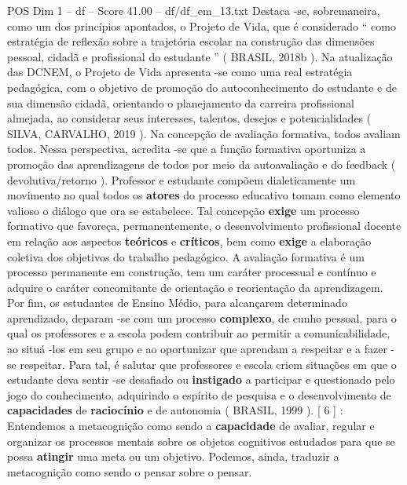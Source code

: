 \begin{textsample}{POS Dim 1 – df – Score 41.00 – df/df\_em\_13.txt}
Destaca -se, sobremaneira, como um dos princípios apontados, o Projeto de Vida, que é considerado “ como estratégia de reflexão sobre a trajetória escolar na construção das dimensões pessoal, cidadã e profissional do estudante ” ( BRASIL, 2018b ).
Na atualização das DCNEM, o Projeto de Vida apresenta -se como uma real estratégia pedagógica, com o objetivo de promoção do autoconhecimento do estudante e de sua dimensão cidadã, orientando o planejamento da carreira profissional almejada, ao considerar seus interesses, talentos, desejos e potencialidades ( SILVA, CARVALHO, 2019 ).
Na concepção de avaliação formativa, todos avaliam todos.
Nessa perspectiva, acredita -se que a função formativa oportuniza a promoção das aprendizagens de todos por meio da autoavaliação e do feedback ( devolutiva/retorno ).
Professor e estudante compõem dialeticamente um movimento no qual todos os \textbf{atores} do processo educativo tomam como elemento valioso o diálogo que ora se estabelece.
Tal concepção \textbf{exige} um processo formativo que favoreça, permanentemente, o desenvolvimento profissional docente em relação aos aspectos \textbf{teóricos} e \textbf{críticos}, bem como \textbf{exige} a elaboração coletiva dos objetivos do trabalho pedagógico.
A avaliação formativa é um processo permanente em construção, tem um caráter processual e contínuo e adquire o caráter concomitante de orientação e reorientação da aprendizagem.
Por fim, os estudantes de Ensino Médio, para alcançarem determinado aprendizado, deparam -se com um processo \textbf{complexo}, de cunho pessoal, para o qual os professores e a escola podem contribuir ao permitir a comunicabilidade, ao situá -los em seu grupo e ao oportunizar que aprendam a respeitar e a fazer -se respeitar.
Para tal, é salutar que professores e escola criem situações em que o estudante deva sentir -se desafiado ou \textbf{instigado} a participar e questionado pelo jogo do conhecimento, adquirindo o espírito de pesquisa e o desenvolvimento de \textbf{capacidades} de \textbf{raciocínio} e de autonomia ( BRASIL, 1999 ). [ 6 ] : Entendemos a metacognição como sendo a \textbf{capacidade} de avaliar, regular e organizar os processos mentais sobre os objetos cognitivos estudados para que se possa \textbf{atingir} uma meta ou um objetivo.
Podemos, ainda, traduzir a metacognição como sendo o pensar sobre o pensar.

\end{textsample}
